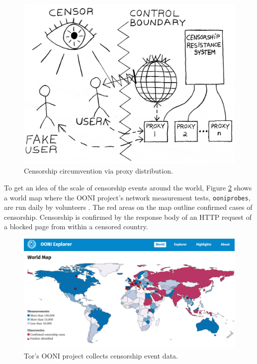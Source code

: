 \begin{figure}[h!]
\centering
     \includegraphics[width=1.0\textwidth]{fig/censor_crs_new.png}
    \caption{Censorship circumvention via proxy distribution.}
    \label{fig:proxydistro}
\end{figure}

To get an idea of the scale of censorship events around the world, Figure \ref{fig:oonimap} shows a world map where the \ac{OONI} project's network measurement tests, \texttt{ooniprobes}, are run daily by volunteers \cite{OONI:2019}. The red areas on the map outline confirmed cases of censorship. Censorship is confirmed by the response body of an \ac{HTTP} request of a blocked page from within a censored country.

\begin{figure}[h!]
\centering
     \includegraphics[width=1.0\textwidth]{fig/ooni_map.png}
    \caption{Tor's \ac{OONI} project collects censorship event data.}
    
    \label{fig:oonimap}
\end{figure}

